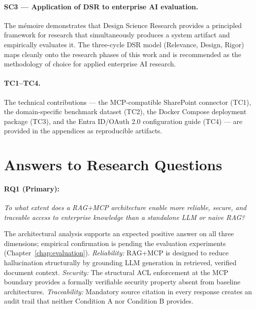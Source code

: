 \paragraph{SC3 --- Application of DSR to enterprise AI evaluation.} The mémoire demonstrates that Design Science Research provides a principled framework for research that simultaneously produces a system artifact and empirically evaluates it. The three-cycle DSR model (Relevance, Design, Rigor) maps cleanly onto the research phases of this work and is recommended as the methodology of choice for applied enterprise AI research.

\paragraph{TC1--TC4.} The technical contributions --- the MCP-compatible SharePoint connector (TC1), the domain-specific benchmark dataset (TC2), the Docker Compose deployment package (TC3), and the Entra ID/OAuth 2.0 configuration guide (TC4) --- are provided in the appendices as reproducible artifacts.

\section{Answers to Research Questions}
\label{sec:conc-rq-answers}

\paragraph{RQ1 (Primary):} \textit{To what extent does a RAG+MCP architecture enable more reliable, secure, and traceable access to enterprise knowledge than a standalone LLM or naive RAG?}

The architectural analysis supports an expected positive answer on all three dimensions; empirical confirmation is pending the evaluation experiments (Chapter~\ref{chap:evaluation}). \textit{Reliability:} RAG+MCP is designed to reduce hallucination structurally by grounding LLM generation in retrieved, verified document context. \textit{Security:} The structural ACL enforcement at the MCP boundary provides a formally verifiable security property absent from baseline architectures. \textit{Traceability:} Mandatory source citation in every response creates an audit trail that neither Condition A nor Condition B provides.

